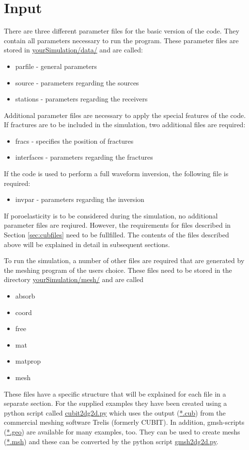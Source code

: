 \chapter{Input}
\label{chap:input}
There are three different parameter files for the basic version of the code. They contain all parameters necessary to run the program. These parameter files are stored in \url{yourSimulation/data/} and are called:
\begin{itemize}
	\item parfile - general parameters
	\item source - parameters regarding the sources
	\item stations - parameters regarding the receivers
\end{itemize}
Additional parameter files are necessary to apply the special features of the code. If fractures are to be included in the simulation, two additional files are required:
\begin{itemize}
	\item fracs - specifies the position of fractures
	\item interfaces - parameters regarding the fractures
\end{itemize}
If the code is used to perform a full waveform inversion, the following file is required:
\begin{itemize}
	\item invpar - parameters regarding the inversion
\end{itemize}
If poroelasticity is to be considered during the simulation, no additional parameter files are reqiured. However, the requirements for files described in Section \ref{sec:cubfiles} need to be fullfilled. The contents of the files described above will be explained in detail in subsequent sections.

\medskip
To run the simulation, a number of other files are required that are generated by the meshing program of the users choice. These files need to be stored in the directory \url{yourSimulation/mesh/} and are called
\begin{itemize}
	\item absorb
	\item coord
	\item free
	\item mat
	\item matprop
	\item mesh
\end{itemize}
These files have a specific structure that will be explained for each file in a separate section. For the supplied examples they have been created using a python script called \url{cubit2dg2d.py} which uses the output (\url{*.cub}) from the commercial meshing software Trelis (formerly CUBIT). In addition, gmsh-scripts (\url{*.geo}) are available for many examples, too. They can be used to create meshs (\url{*.msh}) and these can be converted by the python script \url{gmsh2dg2d.py}.

